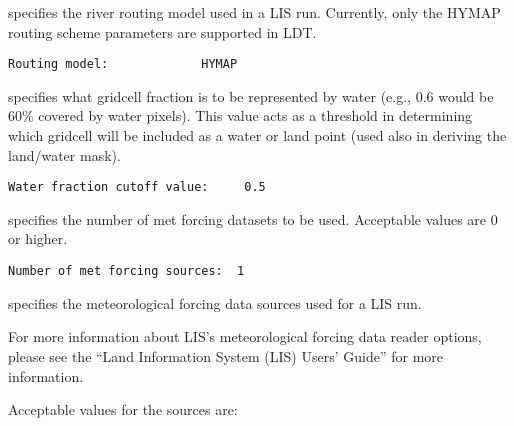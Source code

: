 
  specifies the river routing model used in a LIS run.
 Currently, only the HYMAP routing scheme parameters are supported in LDT.
 

 \begin{Verbatim}[frame=single]
Routing model:             HYMAP
 \end{Verbatim}

 
  specifies what gridcell
 fraction is to be represented by water (e.g., 0.6 would be 60\%
 covered by water pixels).  This value acts as a threshold in
 determining which gridcell will be included as a water
 or land point (used also in deriving the land/water mask). \\
 

 \begin{Verbatim}[frame=single]
Water fraction cutoff value:     0.5
 \end{Verbatim}

 
  specifies the
 number of met forcing datasets to be used. Acceptable
 values are 0 or higher.
 

 \begin{Verbatim}[frame=single]
Number of met forcing sources:  1
 \end{Verbatim}

 
  specifies the meteorological 
 forcing data sources used for a LIS run.

 For more information about LIS's meteorological forcing
 data reader options, please see the 
 ``Land Information System (LIS) Users' Guide'' for more
 information.

 Acceptable values for the sources are:


